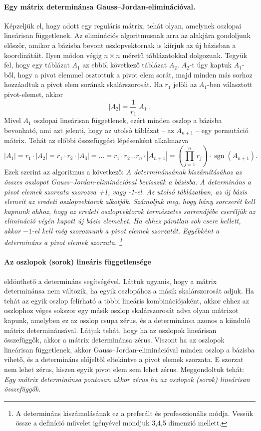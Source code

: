 \documentclass[9pt, a4paper, showtrims]{memoir}
\theoremstyle{plain}
\theoremstyle{remark}
\theoremstyle{definition}
\DeclareMathOperator{\sgn}{sgn}
\begin{document}
\paragraph{Egy mátrix determinánsa Gauss--Jordan-eliminációval.}
Képzeljük el, hogy adott egy reguláris mátrix, tehát olyan, amelynek oszlopai lineárisan függetlenek.
Az eliminációs algoritmusnak arra az alakjára gondoljunk először, amikor a bázisba bevont oszlopvektornak
is kiírjuk az új bázisban a koordinátáit. 
Ilyen módon végig $n\times n$ méretű táblázatokkal dolgozunk.
Tegyük fel, hogy egy táblázat $A_1$ az ebből következő táblázat $A_2$.
$A_2$-t úgy kaptuk $A_1$-ből, hogy a pivot elemmel osztottuk a pivot elem sorát,
majd minden más sorhoz hozzáadtuk a pivot elem sorának skalárszorosát.
Ha $r_1$ jelöli az $A_1$-ben választott pivot-elemet, akkor
\[
    |A_2|=\frac{1}{r_1}|A_1|.
\]
Mivel $A_1$ oszlopai lineárisan függetlenek, ezért minden oszlop a bázisba bevonható,
ami azt jelenti, hogy az utolsó táblázat -- az $A_{n+1}$ -- egy permutáció mátrix.
Tehát az előbbi összefüggést lépésenként alkalmazva
\[
    |A_1|=r_1\cdot |A_2|=r_1\cdot r_2\cdot |A_3|=\dots=r_1\cdot r_2\dots r_{n}\cdot|A_{n+1}|=\left(\prod_{j=1}^nr_j  \right)\cdot\sgn(A_{n+1}).
\]
Ezek szerint az algoritmus a következő:
\emph{
$A$ determinánsának kiszámításához az összes oszlopot Gauss--Jordan-eliminációval bevisszük a bázisba.
A determináns a pivot elemek szorzata szorozva +1, vagy -1-el.
Az utolsó táblázatban, az új bázis elemeit az eredeti oszlopvektorok alkotják.
Számoljuk meg, hogy hány sorcserét kell kapnunk ahhoz, hogy az eredeti oszlopvektorok természetes sorrendjébe cseréljük az elimináció
végén kapott új bázis elemeket. 
Ha ehhez páratlan sok csere kellett, akkor $-1$-el kell még szoroznunk a pivot elemek szorzatát.
Egyébként a determináns a pivot elemek szorzata.
\footnote{
A determináns kiszámolásának ez a preferált és professzionális módja. 
Vessük össze a definíció művelet igényével mondjuk 3,4,5 dimenzió mellett.}
}

\paragraph{Az oszlopok (sorok) lineáris függetlensége} eldönthető a determináns segítségével.
Láttuk ugyanis, hogy a mátrix determinánsa nem változik, ha egyik oszlopához a másik skalárszorosát adjuk.
Ha tehát az egyik oszlop felírható a többi lineáris kombinációjaként, 
akkor ehhez az oszlophoz véges sokszor egy másik oszlop skalárszorosát adva olyan mátrixot kapunk, 
amelyben ez az oszlop csupa zérus, és a determinánsa azonos a kiinduló mátrix determinánsával. 
Látjuk tehát, hogy ha az oszlopok lineárisan összefüggők, akkor a mátrix determinánsa zérus.
Viszont ha az oszlopok lineárisan függetlenek, 
akkor Gauss--Jordan-eliminációval minden oszlop a bázisba vihető, és a determináns előjeltől eltekintve a pivot elemek szorzata.
E szorzat nem lehet zérus, hiszen egyik pivot elem sem lehet zérus.
Meggondoltuk tehát: 
\emph{
Egy mátrix determinánsa pontosan akkor zérus ha az oszlopok (sorok) lineárisan összefüggők.
}
\end{document}
